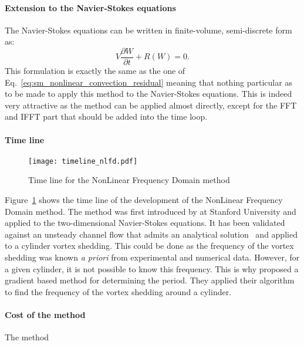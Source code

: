 \paragraph{Extension to the Navier-Stokes equations}
The Navier-Stokes equations can be written in finite-volume,
semi-discrete form as:
\begin{equation}
	V \frac{\partial W}{\partial t} + R(W) = 0.
	\label{eq:navier_stokes_fv_sd}
\end{equation}
This formulation is exactly the same as the one of 
Eq.~\ref{eq:sm_nonlinear_convection_residual} meaning that
nothing particular as to be made to apply this method to
the Navier-Stokes equations. This is indeed very attractive as the
method can be applied almost directly, except for the FFT and IFFT
part that should be added into the time loop.

\paragraph{Time line}
\begin{figure}[htbp]
  \centering
  \texttt{[image: timeline\_nlfd.pdf]}
  \caption{Time line for the NonLinear Frequency Domain method}
  \label{fig:timeline_nlfd}
\end{figure}
Figure~\ref{fig:timeline_nlfd} shows the time line of the
development of the NonLinear Frequency Domain method.
The method was first introduced by \citet{McMullen2001}
at Stanford University and applied to the two-dimensional
Navier-Stokes equations. It has been validated against an
unsteady channel flow that admits an analytical 
solution~\cite{Merkle1987} and applied to a cylinder
vortex shedding. This could be done as the frequency of the
vortex shedding was known \textit{a priori} from experimental
and numerical data. However, for a given cylinder, it is not
possible to know this frequency. This is why \citet{McMullen2002}
proposed a gradient based method for determining the period.
They applied their algorithm to find the frequency of the vortex
shedding around a cylinder.

\paragraph{Cost of the method}
The method 